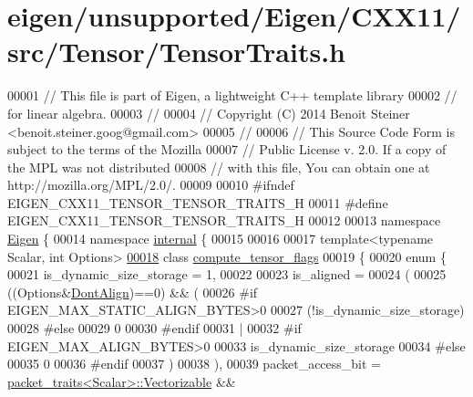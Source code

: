 \hypertarget{eigen_2unsupported_2_eigen_2_c_x_x11_2src_2_tensor_2_tensor_traits_8h_source}{}\section{eigen/unsupported/\+Eigen/\+C\+X\+X11/src/\+Tensor/\+Tensor\+Traits.h}
\label{eigen_2unsupported_2_eigen_2_c_x_x11_2src_2_tensor_2_tensor_traits_8h_source}

\begin{DoxyCode}
00001 \textcolor{comment}{// This file is part of Eigen, a lightweight C++ template library}
00002 \textcolor{comment}{// for linear algebra.}
00003 \textcolor{comment}{//}
00004 \textcolor{comment}{// Copyright (C) 2014 Benoit Steiner <benoit.steiner.goog@gmail.com>}
00005 \textcolor{comment}{//}
00006 \textcolor{comment}{// This Source Code Form is subject to the terms of the Mozilla}
00007 \textcolor{comment}{// Public License v. 2.0. If a copy of the MPL was not distributed}
00008 \textcolor{comment}{// with this file, You can obtain one at http://mozilla.org/MPL/2.0/.}
00009 
00010 \textcolor{preprocessor}{#ifndef EIGEN\_CXX11\_TENSOR\_TENSOR\_TRAITS\_H}
00011 \textcolor{preprocessor}{#define EIGEN\_CXX11\_TENSOR\_TENSOR\_TRAITS\_H}
00012 
00013 \textcolor{keyword}{namespace }\hyperlink{namespace_eigen}{Eigen} \{
00014 \textcolor{keyword}{namespace }\hyperlink{namespaceinternal}{internal} \{
00015 
00016 
00017 \textcolor{keyword}{template}<\textcolor{keyword}{typename} Scalar, \textcolor{keywordtype}{int} Options>
\hyperlink{class_eigen_1_1internal_1_1compute__tensor__flags}{00018} \textcolor{keyword}{class }\hyperlink{class_eigen_1_1internal_1_1compute__tensor__flags}{compute\_tensor\_flags}
00019 \{
00020   \textcolor{keyword}{enum} \{
00021     is\_dynamic\_size\_storage = 1,
00022 
00023     is\_aligned =
00024     (
00025         ((Options&\hyperlink{group__enums_ggaacded1a18ae58b0f554751f6cdf9eb13a40a452614141522dd313363dbbd65726}{DontAlign})==0) && (
00026 \textcolor{preprocessor}{#if EIGEN\_MAX\_STATIC\_ALIGN\_BYTES>0}
00027             (!is\_dynamic\_size\_storage)
00028 #\textcolor{keywordflow}{else}
00029             0
00030 #endif
00031             |
00032 #\textcolor{keywordflow}{if} EIGEN\_MAX\_ALIGN\_BYTES>0
00033             is\_dynamic\_size\_storage
00034 #\textcolor{keywordflow}{else}
00035             0
00036 #endif
00037       )
00038      ),
00039     packet\_access\_bit = \hyperlink{struct_eigen_1_1internal_1_1packet__traits}{packet\_traits<Scalar>::Vectorizable} && 

\end{DoxyCode}
